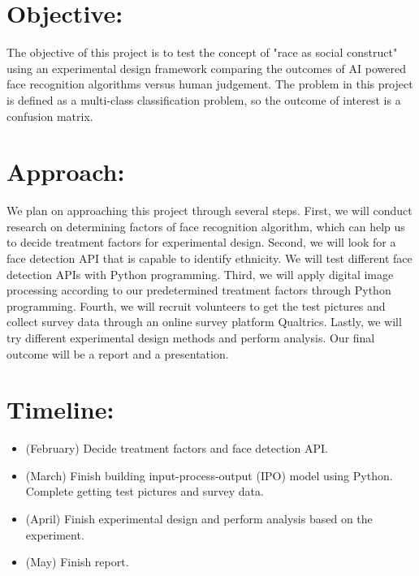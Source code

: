 \documentclass{article}
\begin{document}
    \begin{normalsize}
    
    	\section{Objective:}
        
        The objective of this project is to test the concept of "race as social construct" using an experimental design framework comparing the outcomes of AI powered face recognition algorithms versus human judgement. The problem in this project is defined as a multi-class classification problem, so the outcome of interest is a confusion matrix.
        
	   	\section{Approach:}
        
        We plan on approaching this project through several steps.  First, we will conduct research on determining factors of face recognition algorithm, which can help us to decide treatment factors for experimental design. Second, we will look for a face detection API that is capable to identify ethnicity. We will test different face detection APIs with Python programming. Third, we will apply digital image processing according to our predetermined treatment factors through Python programming. Fourth, we will recruit volunteers to get the test pictures and collect survey data through an online survey platform Qualtrics. Lastly, we will try different experimental design methods and perform analysis. Our final outcome will be a report and a presentation. 
        
    	\section{Timeline:}
        
        \begin{itemize}
        \item (February) Decide treatment factors and face detection API.
        \item (March) Finish building input-process-output (IPO) model using Python. Complete getting test pictures and survey data.
        \item (April) Finish experimental design and perform analysis based on the experiment. 
        \item (May) Finish report.
        \end{itemize}
        

\end{normalsize}
\end{document}
